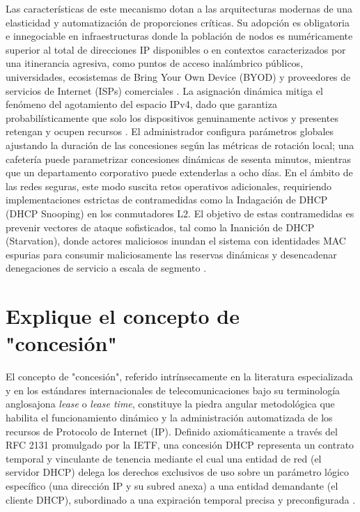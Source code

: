 \documentclass[a4paper,12pt]{article}
\begin{document}
Las características de este mecanismo dotan a las arquitecturas modernas de una elasticidad y automatización de proporciones críticas. Su adopción es obligatoria e innegociable en infraestructuras donde la población de nodos es numéricamente superior al total de direcciones IP disponibles o en contextos caracterizados por una itinerancia agresiva, como puntos de acceso inalámbrico públicos, universidades, ecosistemas de Bring Your Own Device (BYOD) y proveedores de servicios de Internet (ISPs) comerciales \cite{godaddy_dhcp, ionos_dhcp_config}. La asignación dinámica mitiga el fenómeno del agotamiento del espacio IPv4, dado que garantiza probabilísticamente que solo los dispositivos genuinamente activos y presentes retengan y ocupen recursos \cite{akamai_dhcp, ionos_dhcp_config}. El administrador configura parámetros globales ajustando la duración de las concesiones según las métricas de rotación local; una cafetería puede parametrizar concesiones dinámicas de sesenta minutos, mientras que un departamento corporativo puede extenderlas a ocho días. En el ámbito de las redes seguras, este modo suscita retos operativos adicionales, requiriendo implementaciones estrictas de contramedidas como la Indagación de DHCP (DHCP Snooping) en los conmutadores L2. El objetivo de estas contramedidas es prevenir vectores de ataque sofisticados, tal como la Inanición de DHCP (Starvation), donde actores maliciosos inundan el sistema con identidades MAC espurias para consumir maliciosamente las reservas dinámicas y desencadenar denegaciones de servicio a escala de segmento \cite{akamai_dhcp}.

\newpage

\section{Explique el concepto de "concesión"}

El concepto de "concesión", referido intrínsecamente en la literatura especializada y en los estándares internacionales de telecomunicaciones bajo su terminología anglosajona \textit{lease} o \textit{lease time}, constituye la piedra angular metodológica que habilita el funcionamiento dinámico y la administración automatizada de los recursos de Protocolo de Internet (IP). Definido axiomáticamente a través del RFC 2131 promulgado por la IETF, una concesión DHCP representa un contrato temporal y vinculante de tenencia mediante el cual una entidad de red (el servidor DHCP) delega los derechos exclusivos de uso sobre un parámetro lógico específico (una dirección IP y su subred anexa) a una entidad demandante (el cliente DHCP), subordinado a una expiración temporal precisa y preconfigurada \cite{rfc2131, manageengine_dhcp_lease, serviciosgs_dhcp}. 
\end{document}
